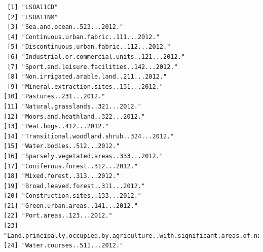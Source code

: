 \documentclass[
  letterpaper,
  DIV=11,
  numbers=noendperiod]{scrreprt}
\begin{document}
\begin{verbatim}
 [1] "LSOA11CD"                                                                                           
 [2] "LSOA11NM"                                                                                           
 [3] "Sea.and.ocean..523...2012."                                                                         
 [4] "Continuous.urban.fabric..111...2012."                                                               
 [5] "Discontinuous.urban.fabric..112...2012."                                                            
 [6] "Industrial.or.commercial.units..121...2012."                                                        
 [7] "Sport.and.leisure.facilities..142...2012."                                                          
 [8] "Non.irrigated.arable.land..211...2012."                                                             
 [9] "Mineral.extraction.sites..131...2012."                                                              
[10] "Pastures..231...2012."                                                                              
[11] "Natural.grasslands..321...2012."                                                                    
[12] "Moors.and.heathland..322...2012."                                                                   
[13] "Peat.bogs..412...2012."                                                                             
[14] "Transitional.woodland.shrub..324...2012."                                                           
[15] "Water.bodies..512...2012."                                                                          
[16] "Sparsely.vegetated.areas..333...2012."                                                              
[17] "Coniferous.forest..312...2012."                                                                     
[18] "Mixed.forest..313...2012."                                                                          
[19] "Broad.leaved.forest..311...2012."                                                                   
[20] "Construction.sites..133...2012."                                                                    
[21] "Green.urban.areas..141...2012."                                                                     
[22] "Port.areas..123...2012."                                                                            
[23] "Land.principally.occupied.by.agriculture..with.significant.areas.of.natural.vegetation..243...2012."
[24] "Water.courses..511...2012."                                                                         

\end{verbatim}
\end{document}
